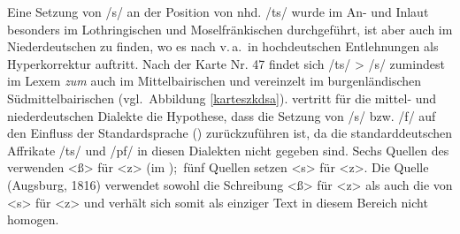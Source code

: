 { 


Eine Setzung von /s/ an der Position von nhd. /ts/ wurde im An- und Inlaut besonders im Lothringischen und Moselfränkischen durchgeführt, ist aber auch im Niederdeutschen zu finden, wo es nach \cite[282]{Schirmunski1962} v.\,a.\, in hochdeutschen Entlehnungen als Hyperkorrektur auftritt. Nach der  Karte Nr. 47 findet sich /ts/ > /s/ zumindest im Lexem \textit{zum} auch im Mittelbairischen und vereinzelt im burgenländischen Südmittelbairischen (vgl.\, Abbildung \ref{karteszkdsa}). \cite[282, 273]{Schirmunski1962} vertritt für die mittel- und niederdeutschen Dialekte die Hypothese, dass die Setzung von /s/ bzw. /f/ auf den Einfluss der Standardsprache () zurückzuführen ist, da die standarddeutschen Affrikate /ts/ und /pf/ in diesen Dialekten nicht gegeben sind. Sechs Quellen des  verwenden <ß> für <z> (im );\, fünf Quellen setzen <s> für <z>. Die Quelle  (Augsburg, 1816) verwendet sowohl die Schreibung <ß> für <z> als auch die von  <s> für <z> und verhält sich somit als einziger Text in diesem Bereich nicht homogen.


\begin{figure}
\end{figure}}
